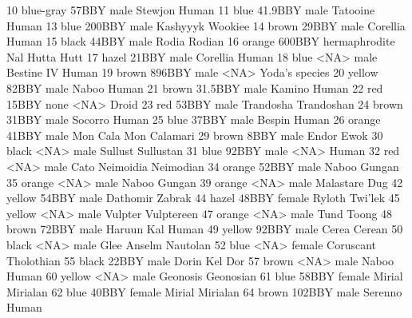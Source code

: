 \documentclass [a4paper] {article}
\begin{document}
\begin{Schunk}
\begin{Soutput}
10     blue-gray      57BBY          male        Stewjon          Human
11          blue    41.9BBY          male       Tatooine          Human
13          blue     200BBY          male       Kashyyyk        Wookiee
14         brown      29BBY          male       Corellia          Human
15         black      44BBY          male          Rodia         Rodian
16        orange     600BBY hermaphrodite      Nal Hutta           Hutt
17         hazel      21BBY          male       Corellia          Human
18          blue       <NA>          male     Bestine IV          Human
19         brown     896BBY          male           <NA> Yoda's species
20        yellow      82BBY          male          Naboo          Human
21         brown    31.5BBY          male         Kamino          Human
22           red      15BBY          none           <NA>          Droid
23           red      53BBY          male      Trandosha     Trandoshan
24         brown      31BBY          male        Socorro          Human
25          blue      37BBY          male         Bespin          Human
26        orange      41BBY          male       Mon Cala   Mon Calamari
29         brown       8BBY          male          Endor           Ewok
30         black       <NA>          male        Sullust      Sullustan
31          blue      92BBY          male           <NA>          Human
32           red       <NA>          male Cato Neimoidia      Neimodian
34        orange      52BBY          male          Naboo         Gungan
35        orange       <NA>          male          Naboo         Gungan
39        orange       <NA>          male      Malastare            Dug
42        yellow      54BBY          male       Dathomir         Zabrak
44         hazel      48BBY        female         Ryloth        Twi'lek
45        yellow       <NA>          male        Vulpter     Vulptereen
47        orange       <NA>          male           Tund          Toong
48         brown      72BBY          male     Haruun Kal          Human
49        yellow      92BBY          male          Cerea         Cerean
50         black       <NA>          male    Glee Anselm       Nautolan
52          blue       <NA>        female      Coruscant     Tholothian
55         black      22BBY          male          Dorin        Kel Dor
57         brown       <NA>          male          Naboo          Human
60        yellow       <NA>          male       Geonosis      Geonosian
61          blue      58BBY        female         Mirial       Mirialan
62          blue      40BBY        female         Mirial       Mirialan
64         brown     102BBY          male        Serenno          Human

\end{Soutput}
\end{Schunk}
\end{document}
